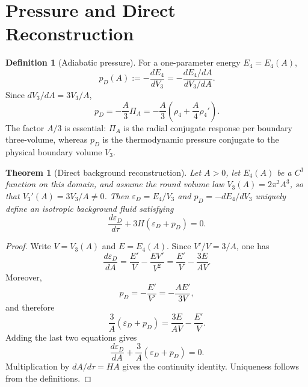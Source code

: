 \documentclass[11pt,a4paper]{article}
\def\dd{d}%
\numberwithin{equation}{section}
\theoremstyle{definition}
\newtheorem{definition}[criterion]{Definition}
\theoremstyle{plain}
\newtheorem{theorem}[criterion]{Theorem}
\theoremstyle{remark}
\newcommand{\Efour}{E_4}
\newcommand{\rhoFour}{\rho_4}
\newcommand{\epsD}{\varepsilon_D}
\newcommand{\pD}{p_D}
\newcommand{\PiA}{\Pi_A}
\newcommand{\dd}{\mathrm{d}}
\begin{document}
\section{Pressure and Direct Reconstruction}
\begin{definition}[Adiabatic pressure]
For a one-parameter energy \(\Efour=\Efour(A)\),
\begin{equation}
\pD(A):=-\frac{\dd\Efour}{\dd V_3}
=-\frac{\dd\Efour/\dd A}{\dd V_3/\dd A}.
\end{equation}
Since \(\dd V_3/\dd A=3V_3/A\),
\begin{equation}
\pD=-\frac{A}{3}\PiA
=-\frac{A}{3}\left(\rhoFour+\frac{A}{4}\rhoFour'\right).
\end{equation}
The factor \(A/3\) is essential: \(\PiA\) is the radial conjugate response per boundary three-volume, whereas \(\pD\) is the thermodynamic pressure conjugate to the physical boundary volume \(V_3\).
\end{definition}

\begin{theorem}[Direct background reconstruction]
Let \(A>0\), let \(\Efour(A)\) be a \(C^1\) function on this domain, and assume the round volume law \(V_3(A)=2\pi^2A^3\), so that \(V_3'(A)=3V_3/A\neq0\). Then \(\epsD=\Efour/V_3\) and \(\pD=-\dd\Efour/\dd V_3\) uniquely define an isotropic background fluid satisfying
\begin{equation}
\frac{\dd\epsD}{\dd\tau}+3H(\epsD+\pD)=0.
\end{equation}
\end{theorem}
\begin{proof}
Write \(V=V_3(A)\) and \(E=\Efour(A)\). Since \(V'/V=3/A\), one has
\begin{equation}
\frac{\dd\epsD}{\dd A}
=\frac{E'}{V}-\frac{EV'}{V^2}
=\frac{E'}{V}-\frac{3E}{AV}.
\end{equation}
Moreover,
\begin{equation}
\pD=-\frac{E'}{V'}
=-\frac{AE'}{3V},
\end{equation}
and therefore
\begin{equation}
\frac{3}{A}(\epsD+\pD)
=\frac{3E}{AV}-\frac{E'}{V}.
\end{equation}
Adding the last two equations gives
\begin{equation}
\frac{\dd\epsD}{\dd A}
+\frac{3}{A}(\epsD+\pD)=0.
\end{equation}
Multiplication by \(\dd A/\dd\tau=HA\) gives the continuity identity. Uniqueness follows from the definitions.
\end{proof}
\end{document}
